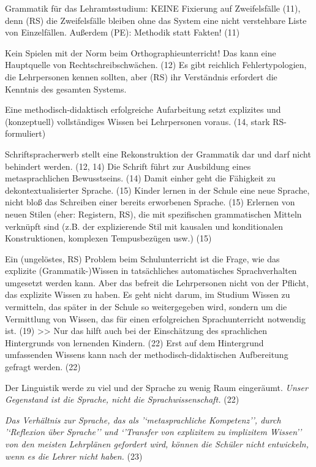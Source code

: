 Grammatik für das Lehramtsstudium: KEINE Fixierung auf Zweifelsfälle (11), denn (RS) die Zweifelsfälle bleiben ohne das System eine nicht verstehbare Liste von Einzelfällen. Außerdem (PE): Methodik statt Fakten! (11)

Kein Spielen mit der Norm beim Orthographieunterricht! Das kann eine Hauptquelle von Rechtschreibschwächen. (12) Es gibt reichlich Fehlertypologien, die Lehrpersonen kennen sollten, aber (RS) ihr Verständnis erfordert die Kenntnis des gesamten Systems.

Eine methodisch-didaktisch erfolgreiche Aufarbeitung setzt explizites und (konzeptuell) vollständiges Wissen bei Lehrpersonen voraus. (14, stark RS-formuliert)

Schriftspracherwerb stellt eine Rekonstruktion der Grammatik dar und darf nicht behindert werden. (12, 14)
Die Schrift führt zur Ausbildung eines metasprachlichen Bewusstseins. (14)
Damit einher geht die Fähigkeit zu dekontextualisierter Sprache. (15)
Kinder lernen in der Schule eine neue Sprache, nicht bloß das Schreiben einer bereits erworbenen Sprache. (15)
Erlernen von neuen Stilen (eher: Registern, RS), die mit spezifischen grammatischen Mitteln verknüpft sind (z.B. der explizierende Stil mit kausalen und konditionalen Konstruktionen, komplexen Tempusbezügen usw.) (15)

Ein (ungelöstes, RS) Problem beim Schulunterricht ist die Frage, wie das explizite (Grammatik-)Wissen in tatsächliches automatisches Sprachverhalten umgesetzt werden kann.
Aber das befreit die Lehrpersonen nicht von der Pflicht, das explizite Wissen zu haben.
Es geht nicht darum, im Studium Wissen zu vermitteln, das später in der Schule so weitergegeben wird, sondern um die Vermittlung von Wissen, das für einen erfolgreichen Sprachunterricht notwendig ist. (19)
>>
Nur das hilft auch bei der Einschätzung des sprachlichen Hintergrunds von lernenden Kindern. (22)
Erst auf dem Hintergrund umfassenden Wissens kann nach der methodisch-didaktischen Aufbereitung gefragt werden. (22)


Der Linguistik werde zu viel und der Sprache zu wenig Raum eingeräumt. 
\textit{Unser Gegenstand ist die Sprache, nicht die Sprachwissenschaft.} (22)

\textit{Das Verhältnis zur Sprache, das als '`metasprachliche Kompetenz'', durch '`Reflexion über Sprache'' und `'Transfer von explizitem zu implizitem Wissen'' von den meisten Lehrplänen gefordert wird, können die Schüler nicht entwickeln, wenn es die Lehrer nicht haben.} (23)


